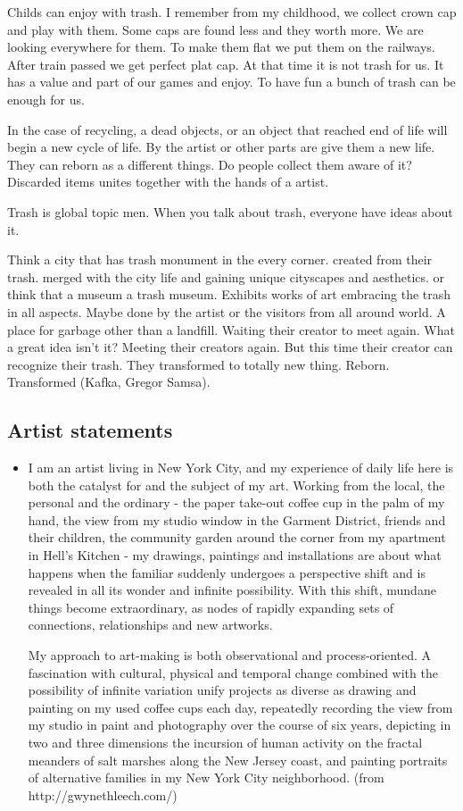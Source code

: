 Childs can enjoy with trash. I remember from my childhood, we collect crown cap and play with them. Some caps are found less and they worth more. We are looking everywhere for them. To make them flat we put them on the railways. After train passed we get perfect plat cap. At that time it is not trash for us. It has a value and part of our games and enjoy. To have fun a bunch of trash can be enough for us.

In the case of recycling, a dead objects, or an object that reached end of life will begin a new cycle of life. By the artist or other parts are give them a new life. They can reborn as a different things. Do people collect them aware of it? Discarded items unites together with the hands of a artist. 

Trash is global topic men. When you talk about trash, everyone have ideas about it. 

Think a city that has trash monument in the every corner. created from their trash. merged with the city life and gaining unique cityscapes and aesthetics. or think that a museum a trash museum. Exhibits works of art embracing the trash in all aspects. Maybe done by the artist or the visitors from all around world. A place for garbage other than a landfill. Waiting their creator to meet again. What a great idea isn't it? Meeting their creators again. But this time their creator can recognize their trash. They transformed to totally new thing. Reborn. Transformed (Kafka, Gregor Samsa).

\subsection{Artist statements}
\begin{itemize}
\item I am an artist living in New York City, and my experience of daily life here is both the catalyst for and the subject of my art. Working from the local, the personal and the ordinary - the paper take-out coffee cup in the palm of my hand, the view from my studio window in the Garment District, friends and their children, the community garden around the corner from my apartment in Hell's Kitchen - my drawings, paintings and installations are about what happens when the familiar suddenly undergoes a perspective shift and is revealed in all its wonder and infinite possibility. With this shift, mundane things become extraordinary, as nodes of rapidly expanding sets of connections, relationships and new artworks. 

My approach to art-making is both observational and process-oriented. A fascination with cultural, physical and temporal change combined with the possibility of infinite variation unify projects as diverse as drawing and painting on my used coffee cups each day, repeatedly recording the view from my studio in paint and photography over the course of six years, depicting in two and three dimensions the incursion of human activity on the fractal meanders of salt marshes along the New Jersey coast, and painting portraits of alternative families in my New York City neighborhood. (from http://gwynethleech.com/)
\end{itemize}


